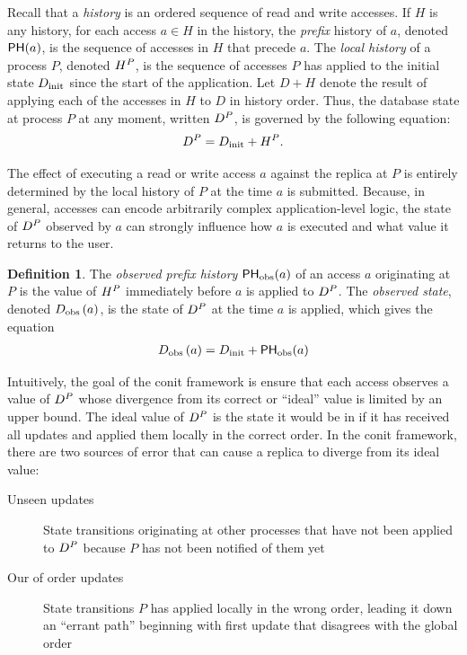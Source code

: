 \documentclass[]             %
{NASA}                       %
\theoremstyle{definition}
\newtheorem{definition}[theorem]{Definition}
\begin{document}
Recall that a \emph{history} is an ordered sequence of read and write
accesses. If $H$ is any history, for each access $a \in H$ in the
history, the \emph{prefix} history of $a$, denoted
$\mathsf{PH}{\left(a\right)}$, is the sequence of accesses in $H$ that precede
$a$. The \emph{local history} of a process $P$, denoted
$H^{P}$, is the sequence of accesses $P$ has applied to the
initial state $D_\textrm{init}$ since the start of the application. Let $D + H$
denote the result of applying each of the accesses in $H$ to $D$ in
history order. Thus, the database state at process $P$ at any moment,
written $D^{P}$, is governed by the following equation:
\begin{equation}
  D^{P} = D_\textrm{init} + H^{P}. \label{eq:conit-D-obs}
\end{equation}


The effect of executing a read or write access $a$ against the replica
at $P$ is entirely determined by the local history of $P$ at the time
$a$ is submitted. Because, in general, accesses can encode arbitrarily
complex application-level logic, the state of $D^{P}$ observed by $a$
can strongly influence how $a$ is executed and what value it returns
to the user.

\begin{definition}
  The \emph{observed prefix history} $\mathsf{PH}_{\mathrm{obs}}{\left(a\right)}$ of an
  access $a$ originating at $P$ is the value of $H^{P}$
  immediately before $a$ is applied to $D^{P}$. The
  \emph{observed state}, denoted $D_{\textrm{obs}}\left(a\right)$, is the state of
  $D^{P}$ at the time $a$ is applied, which gives the equation
  \begin{gather}
    D_{\textrm{obs}}\left(a\right) = D_\textrm{init} + \mathsf{PH}_{\mathrm{obs}}{\left(a\right)} \label{eq:conit-D-obs-at}
  \end{gather}
\end{definition}


Intuitively, the goal of the conit framework is ensure that each
access observes a value of $D^{P}$ whose divergence from its correct or
``ideal'' value is limited by an upper bound. The ideal value of $D^{P}$
is the state it would be in if it has received all updates and applied
them locally in the correct order. In the conit framework, there are
two sources of error that can cause a replica to diverge from its
ideal value:
\begin{description}
\item[Unseen updates] State transitions originating at other processes
  that have not been applied to $D^{P}$ because $P$ has not
  been notified of them yet
\item[Our of order updates] State transitions $P$ has applied locally
  in the wrong order, leading it down an ``errant path'' beginning
  with first update that disagrees with the global order
\end{description}
\end{document}
